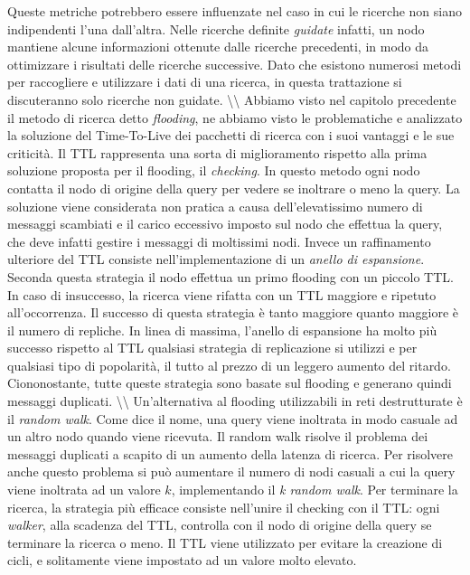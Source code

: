 Queste metriche potrebbero essere influenzate nel caso in cui le ricerche non siano indipendenti l'una dall'altra. Nelle ricerche definite \emph{guidate} infatti, un nodo mantiene alcune informazioni ottenute dalle ricerche precedenti, in modo da ottimizzare i risultati delle ricerche successive. Dato che esistono numerosi metodi per raccogliere e utilizzare i dati di una ricerca, in questa trattazione si discuteranno solo ricerche non guidate. \textbackslash{}\textbackslash{} Abbiamo visto nel capitolo precedente il metodo di ricerca detto \emph{flooding}, ne abbiamo visto le problematiche e analizzato la soluzione del Time-To-Live dei pacchetti di ricerca con i suoi vantaggi e le sue criticità. Il TTL rappresenta una sorta di miglioramento rispetto alla prima soluzione proposta per il flooding, il \emph{checking}. In questo metodo ogni nodo contatta il nodo di origine della query per vedere se inoltrare o meno la query. La soluzione viene considerata non pratica a causa dell'elevatissimo numero di messaggi scambiati e il carico eccessivo imposto sul nodo che effettua la query, che deve infatti gestire i messaggi di moltissimi nodi. Invece un raffinamento ulteriore del TTL consiste nell'implementazione di un \emph{anello di espansione}. Seconda questa strategia il nodo effettua un primo flooding con un piccolo TTL. In caso di insuccesso, la ricerca viene rifatta con un TTL maggiore e ripetuto all'occorrenza. Il successo di questa strategia è tanto maggiore quanto maggiore è il numero di repliche. In linea di massima, l'anello di espansione ha molto più successo rispetto al TTL qualsiasi strategia di replicazione si utilizzi e per qualsiasi tipo di popolarità, il tutto al prezzo di un leggero aumento del ritardo. Ciononostante, tutte queste strategia sono basate sul flooding e generano quindi messaggi duplicati. \textbackslash{}\textbackslash{} Un'alternativa al flooding utilizzabili in reti destrutturate è il \emph{random walk}. Come dice il nome, una query viene inoltrata in modo casuale ad un altro nodo quando viene ricevuta. Il random walk risolve il problema dei messaggi duplicati a scapito di un aumento della latenza di ricerca. Per risolvere anche questo problema si può aumentare il numero di nodi casuali a cui la query viene inoltrata ad un valore $k$, implementando il \emph{k random walk}. Per terminare la ricerca, la strategia più efficace consiste nell'unire il checking con il TTL: ogni \emph{walker}, alla scadenza del TTL, controlla con il nodo di origine della query se terminare la ricerca o meno. Il TTL viene utilizzato per evitare la creazione di cicli, e solitamente viene impostato ad un valore molto elevato.

